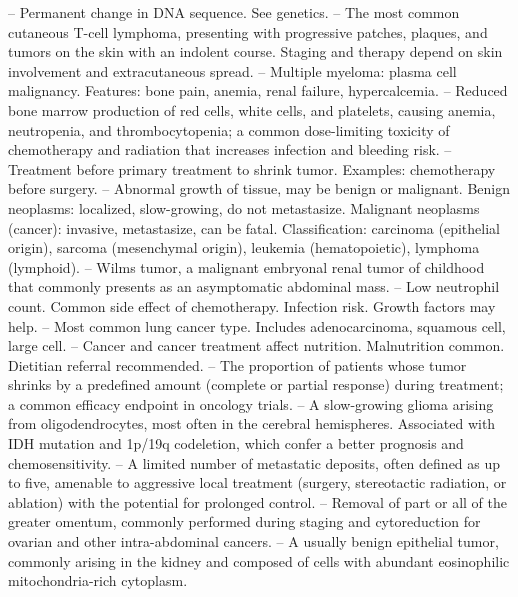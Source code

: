 -- Permanent change in DNA sequence. See genetics.
-- The most common cutaneous T-cell lymphoma, presenting with progressive patches, plaques, and tumors on the skin with an indolent course. Staging and therapy depend on skin involvement and extracutaneous spread.
-- Multiple myeloma: plasma cell malignancy. Features: bone pain, anemia, renal failure, hypercalcemia.
-- Reduced bone marrow production of red cells, white cells, and platelets, causing anemia, neutropenia, and thrombocytopenia; a common dose-limiting toxicity of chemotherapy and radiation that increases infection and bleeding risk.
-- Treatment before primary treatment to shrink tumor. Examples: chemotherapy before surgery.
-- Abnormal growth of tissue, may be benign or malignant. Benign neoplasms: localized, slow-growing, do not metastasize. Malignant neoplasms (cancer): invasive, metastasize, can be fatal. Classification: carcinoma (epithelial origin), sarcoma (mesenchymal origin), leukemia (hematopoietic), lymphoma (lymphoid).
-- Wilms tumor, a malignant embryonal renal tumor of childhood that commonly presents as an asymptomatic abdominal mass.
-- Low neutrophil count. Common side effect of chemotherapy. Infection risk. Growth factors may help.
-- Most common lung cancer type. Includes adenocarcinoma, squamous cell, large cell.
-- Cancer and cancer treatment affect nutrition. Malnutrition common. Dietitian referral recommended.
-- The proportion of patients whose tumor shrinks by a predefined amount (complete or partial response) during treatment; a common efficacy endpoint in oncology trials.
-- A slow-growing glioma arising from oligodendrocytes, most often in the cerebral hemispheres. Associated with IDH mutation and 1p/19q codeletion, which confer a better prognosis and chemosensitivity.
-- A limited number of metastatic deposits, often defined as up to five, amenable to aggressive local treatment (surgery, stereotactic radiation, or ablation) with the potential for prolonged control.
-- Removal of part or all of the greater omentum, commonly performed during staging and cytoreduction for ovarian and other intra-abdominal cancers.
-- A usually benign epithelial tumor, commonly arising in the kidney and composed of cells with abundant eosinophilic mitochondria-rich cytoplasm.
